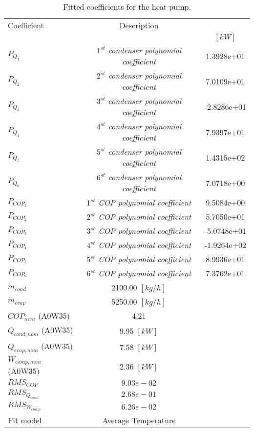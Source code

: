 \documentclass[english]{SPFShortReport}
\author{Dani Carbonell}
\begin{document}
\begin{table}[!ht]
\begin{small}
\caption{Fitted coefficients for the heat pump.}
\begin{center}
\resizebox{12cm}{!} 
{
\begin{tabular}{l | c c } 
\hline
\hline
Coefficient &Description & \\ 
 & &$[kW]$\\ 
\hline
$P_{Q_{1}}$ & \emph{$1^{st}$ condenser polynomial coefficient}  & 1.3928e+01    \\ 
$P_{Q_{2}}$ & \emph{$2^{st}$ condenser polynomial coefficient}  & 7.0109e+01    \\ 
$P_{Q_{3}}$ & \emph{$3^{st}$ condenser polynomial coefficient}  & -2.8286e+01    \\ 
$P_{Q_{4}}$ & \emph{$4^{st}$ condenser polynomial coefficient}  & 7.9397e+01    \\ 
$P_{Q_{5}}$ & \emph{$5^{st}$ condenser polynomial coefficient}  & 1.4315e+02    \\ 
$P_{Q_{6}}$ & \emph{$6^{st}$ condenser polynomial coefficient}  & 7.0718e+00    \\ 
\hline
$P_{COP_{1}}$ & \emph{$1^{st}$ COP polynomial coefficient}  & 9.5084e+00    \\ 
$P_{COP_{2}}$ & \emph{$2^{st}$ COP polynomial coefficient}  & 5.7050e+01    \\ 
$P_{COP_{3}}$ & \emph{$3^{st}$ COP polynomial coefficient}  & -5.0748e+01    \\ 
$P_{COP_{4}}$ & \emph{$4^{st}$ COP polynomial coefficient}  & -1.9264e+02    \\ 
$P_{COP_{5}}$ & \emph{$5^{st}$ COP polynomial coefficient}  & 8.9936e+01    \\ 
$P_{COP_{6}}$ & \emph{$6^{st}$ COP polynomial coefficient}  & 7.3762e+01    \\ 
\hline
$\dot m_{cond}$ & 2100.00 $[kg/h]$ \\ 
$\dot m_{evap}$ & 5250.00 $[kg/h]$ \\ 
\hline
$COP_{nom}$ (A0W35)& 4.21 \\ 
$Q_{cond,nom}$ (A0W35)& 9.95 $[kW]$\\ 
$Q_{evap,nom}$ (A0W35)& 7.58 $[kW]$\\ 
$W_{comp,nom}$ (A0W35)& 2.36 $[kW]$\\ 
\hline
 $RMS_{COP}$ & $9.03e-02$ \\ 
 $RMS_{Q_{cond}}$ & $2.68e-01$ \\ 
 $RMS_{W_{comp}}$ & $6.26e-02$ \\ 
\hline
Fit model & Average Temperature\\ 
\hline
\hline
\end{tabular}
}
\label{CoefTable}
\end{center}
\end{small}
\end{table}
\end{document}
